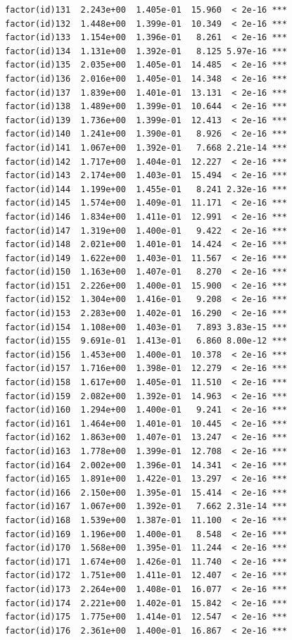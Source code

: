 \documentclass[]{book}
\begin{document}
\begin{verbatim}
factor(id)131  2.243e+00  1.405e-01  15.960  < 2e-16 ***
factor(id)132  1.448e+00  1.399e-01  10.349  < 2e-16 ***
factor(id)133  1.154e+00  1.396e-01   8.261  < 2e-16 ***
factor(id)134  1.131e+00  1.392e-01   8.125 5.97e-16 ***
factor(id)135  2.035e+00  1.405e-01  14.485  < 2e-16 ***
factor(id)136  2.016e+00  1.405e-01  14.348  < 2e-16 ***
factor(id)137  1.839e+00  1.401e-01  13.131  < 2e-16 ***
factor(id)138  1.489e+00  1.399e-01  10.644  < 2e-16 ***
factor(id)139  1.736e+00  1.399e-01  12.413  < 2e-16 ***
factor(id)140  1.241e+00  1.390e-01   8.926  < 2e-16 ***
factor(id)141  1.067e+00  1.392e-01   7.668 2.21e-14 ***
factor(id)142  1.717e+00  1.404e-01  12.227  < 2e-16 ***
factor(id)143  2.174e+00  1.403e-01  15.494  < 2e-16 ***
factor(id)144  1.199e+00  1.455e-01   8.241 2.32e-16 ***
factor(id)145  1.574e+00  1.409e-01  11.171  < 2e-16 ***
factor(id)146  1.834e+00  1.411e-01  12.991  < 2e-16 ***
factor(id)147  1.319e+00  1.400e-01   9.422  < 2e-16 ***
factor(id)148  2.021e+00  1.401e-01  14.424  < 2e-16 ***
factor(id)149  1.622e+00  1.403e-01  11.567  < 2e-16 ***
factor(id)150  1.163e+00  1.407e-01   8.270  < 2e-16 ***
factor(id)151  2.226e+00  1.400e-01  15.900  < 2e-16 ***
factor(id)152  1.304e+00  1.416e-01   9.208  < 2e-16 ***
factor(id)153  2.283e+00  1.402e-01  16.290  < 2e-16 ***
factor(id)154  1.108e+00  1.403e-01   7.893 3.83e-15 ***
factor(id)155  9.691e-01  1.413e-01   6.860 8.00e-12 ***
factor(id)156  1.453e+00  1.400e-01  10.378  < 2e-16 ***
factor(id)157  1.716e+00  1.398e-01  12.279  < 2e-16 ***
factor(id)158  1.617e+00  1.405e-01  11.510  < 2e-16 ***
factor(id)159  2.082e+00  1.392e-01  14.963  < 2e-16 ***
factor(id)160  1.294e+00  1.400e-01   9.241  < 2e-16 ***
factor(id)161  1.464e+00  1.401e-01  10.445  < 2e-16 ***
factor(id)162  1.863e+00  1.407e-01  13.247  < 2e-16 ***
factor(id)163  1.778e+00  1.399e-01  12.708  < 2e-16 ***
factor(id)164  2.002e+00  1.396e-01  14.341  < 2e-16 ***
factor(id)165  1.891e+00  1.422e-01  13.297  < 2e-16 ***
factor(id)166  2.150e+00  1.395e-01  15.414  < 2e-16 ***
factor(id)167  1.067e+00  1.392e-01   7.662 2.31e-14 ***
factor(id)168  1.539e+00  1.387e-01  11.100  < 2e-16 ***
factor(id)169  1.196e+00  1.400e-01   8.548  < 2e-16 ***
factor(id)170  1.568e+00  1.395e-01  11.244  < 2e-16 ***
factor(id)171  1.674e+00  1.426e-01  11.740  < 2e-16 ***
factor(id)172  1.751e+00  1.411e-01  12.407  < 2e-16 ***
factor(id)173  2.264e+00  1.408e-01  16.077  < 2e-16 ***
factor(id)174  2.221e+00  1.402e-01  15.842  < 2e-16 ***
factor(id)175  1.775e+00  1.414e-01  12.547  < 2e-16 ***
factor(id)176  2.361e+00  1.400e-01  16.867  < 2e-16 ***

\end{verbatim}
\end{document}
